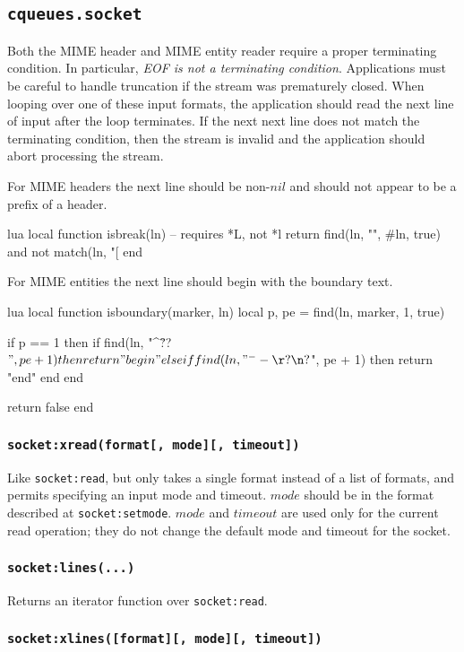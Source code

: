 \documentclass[11pt, oneside]{memoir}
\newcommand*{\fn}[1]{\texttt{#1}\xspace}
\newcommand*{\method}[1]{\texttt{#1}\xspace}
\newcounter{toccols}
\newenvironment{Module}[1]{
	\subsection{\texttt{#1}}
	\addtocontents{toc}{
		\protect\begin{multicols}{\value{toccols}}
	}
}{
	\addtocontents{toc}{\protect\end{multicols}}
}
\begin{document}
\begin{Module}{cqueues.socket}
Both the MIME header and MIME entity reader require a proper terminating condition. In particular, \emph{EOF is not a terminating condition}. Applications must be careful to handle truncation if the stream was prematurely closed. When looping over one of these input formats, the application should read the next line of input after the loop terminates. If the next next line does not match the terminating condition, then the stream is invalid and the application should abort processing the stream.

For MIME headers the next line should be non-$nil$ and should not appear to be a prefix of a header.

\begin{example}{lua}
	local function isbreak(ln) -- requires *L, not *l
		return find(ln, "\n", #ln, true) and not match(ln, "[%
	end
\end{example}

For MIME entities the next line should begin with the boundary text.

\begin{example}{lua}
	local function isboundary(marker, ln)
		local p, pe = find(ln, marker, 1, true)

		if p == 1 then
			if find(ln, "^\r?\n?$", pe + 1) then
				return "begin"
			elseif find(ln, "^--\r?\n?$", pe + 1) then
				return "end"
			end
		end

		return false
	end
\end{example}

\subsubsection[\fn{socket:xread}]{\fn{socket:xread(format[, mode][, timeout])}}

Like \method{socket:read}, but only takes a single format instead of a list of formats, and permits specifying an input mode and timeout. $mode$ should be in the format described at \method{socket:setmode}. $mode$ and $timeout$ are used only for the current read operation; they do not change the default mode and timeout for the socket.

\subsubsection[\fn{socket:lines}]{\fn{socket:lines(...)}}

Returns an iterator function over \method{socket:read}.

\subsubsection[\fn{socket:xlines}]{\fn{socket:xlines([format][, mode][, timeout])}}


\end{Module}
\end{document}
